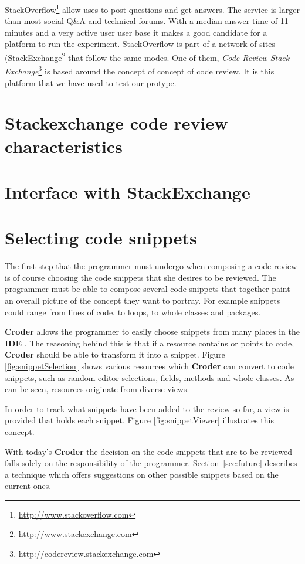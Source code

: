 \documentclass{sigchi}
\newcommand{\croder}{\textbf{Croder }}
\newcommand{\IDE}{\textbf{IDE }}
\begin{document}
StackOverflow\footnote{\url{http://www.stackoverflow.com}} allow uses to post questions and get
answers. The service is larger than most social Q\&A and technical forums. With a median answer time 
of 11 minutes and a very active user user base \cite{Mamykina2011} it makes a good candidate for a
platform to run the experiment. StackOverflow is part of a network of sites (StackExchange\footnote{\url{http://www.stackexchange.com}} that follow the same modes. One of them, \emph{Code
Review Stack Exchange}\footnote{\url{http://codereview.stackexchange.com}} is based around the
concept of concept of code review. It is this platform that we have used to test our protype.

\section{Stackexchange code review characteristics}
\section{Interface with StackExchange}

\section{Selecting code snippets}

 The first step that the programmer must undergo when composing a code review is of course choosing the code snippets that she desires to be reviewed. The programmer must be able to compose several code snippets that together paint an overall picture of the concept they want to portray. For example snippets could range from lines of code, to loops, to whole classes and packages.

 \croder allows the programmer to easily choose snippets from many places in the \IDE. The reasoning behind this is that if a resource contains or points to code, \croder should be able to transform it into a snippet. Figure \ref{fig:snippetSelection} shows  various resources which \croder can convert to code snippets, such as random editor selections, fields, methods and whole classes. As can be seen, resources originate from diverse views.

 In order to track what snippets have been added to the review so far, a view is provided that holds each snippet. Figure \ref{fig:snippetViewer} illustrates this concept.
 
 With today's \croder the decision on the code snippets that are to be reviewed falls solely on the responsibility of the programmer. Section~\ref{sec:future} describes a technique which offers suggestions on other possible snippets based on the current ones.
 
\end{document}
